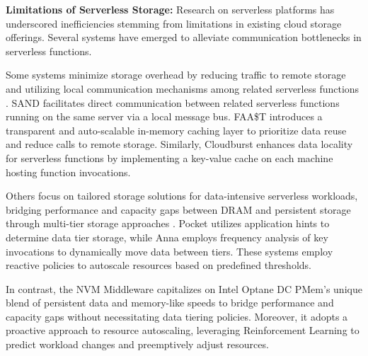 

\textbf{Limitations of Serverless Storage:} Research on serverless platforms has underscored inefficiencies stemming from limitations in existing cloud storage offerings. Several systems have emerged to alleviate communication bottlenecks in serverless functions.

Some systems minimize storage overhead by reducing traffic to remote storage and utilizing local communication mechanisms among related serverless functions \cite{akkus2018sand,romero2021faat}. SAND \cite{akkus2018sand} facilitates direct communication between related serverless functions running on the same server via a local message bus. FAA\$T \cite{romero2021faat} introduces a transparent and auto-scalable in-memory caching layer to prioritize data reuse and reduce calls to remote storage. Similarly, Cloudburst \cite{Sreekanti_2020} enhances data locality for serverless functions by implementing a key-value cache on each machine hosting function invocations.

Others focus on tailored storage solutions for data-intensive serverless workloads, bridging performance and capacity gaps between DRAM and persistent storage through multi-tier storage approaches \cite{klimovic2018pocket,wu2019autoscaling}. Pocket \cite{klimovic2018pocket} utilizes application hints to determine data tier storage, while Anna \cite{wu2019autoscaling} employs frequency analysis of key invocations to dynamically move data between tiers. These systems employ reactive policies to autoscale resources based on predefined thresholds.

In contrast, the NVM Middleware capitalizes on Intel Optane DC PMem's unique blend of persistent data and memory-like speeds to bridge performance and capacity gaps without necessitating data tiering policies. Moreover, it adopts a proactive approach to resource autoscaling, leveraging Reinforcement Learning to predict workload changes and preemptively adjust resources.

